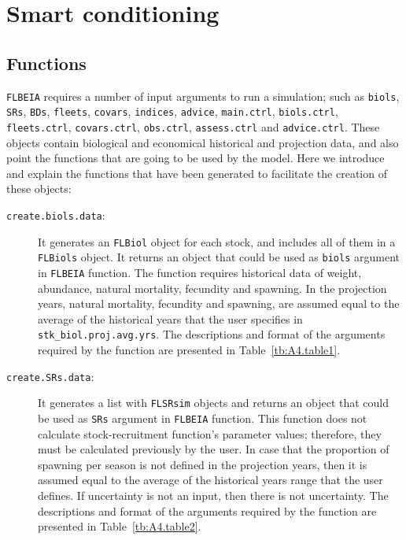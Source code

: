 
\section{Smart conditioning} \label{sec:FLBEIASmartCond}

\subsection{Functions}  \label{sec:SmartCondFun}

	\texttt{FLBEIA} requires a number of input arguments to run a simulation; such as \texttt{biols}, \texttt{SRs}, \texttt{BDs}, \texttt{fleets}, \texttt{covars}, \texttt{indices}, \texttt{advice}, \texttt{main.ctrl}, \texttt{biols.ctrl}, \texttt{fleets.ctrl}, \texttt{covars.ctrl}, \texttt{obs.ctrl}, \texttt{assess.ctrl} and \texttt{advice.ctrl}. These objects contain biological and economical historical and projection data, and also point the functions that are going to be used by the model. Here we introduce and explain the functions that have been generated to facilitate the creation of these objects:

\begin{description}
  \item[\texttt{create.biols.data}:] It generates an \texttt{FLBiol} object for each stock, and includes all of them in a \texttt{FLBiols} object. It returns an object that could be used as \texttt{biols} argument in \texttt{FLBEIA} function. The function requires historical data of weight, abundance, natural mortality, fecundity and spawning. In the projection years, natural mortality, fecundity and spawning, are assumed equal to the average of the historical years that the user specifies in \texttt{stk\_biol.proj.avg.yrs}. The descriptions and format of the arguments required by the function are presented in Table~\ref{tb:A4.table1}.
\end{description}

\begin{description}
  \item[\texttt{create.SRs.data}:] It generates a list with  \texttt{FLSRsim} objects and returns an object that could be used as \texttt{SRs} argument in \texttt{FLBEIA} function. This function does not calculate stock-recruitment function's parameter values; therefore, they must be calculated previously by the user. In case that the proportion of spawning per season is not defined in the projection years, then it is assumed equal to the average of the historical years range that the user defines. If uncertainty is not an input, then there is not uncertainty. The descriptions and format of the arguments required by the function are presented in Table~\ref{tb:A4.table2}.
\end{description}

